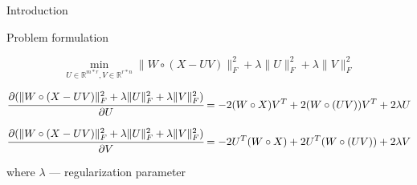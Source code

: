 \documentclass[pdf,10pt]{beamer}
\def\R{\mathbb{R}}
\begin{document}
\begin{section}{Introduction}
\begin{subsection}{Problem formulation}
\begin{frame}
     \begin{equation}
       \min_{U \in \R^{m*r}, V \in \R^{r*n}} \|W \circ (X - UV)\|^2_F + \lambda\|U\|^2_F + \lambda\|V\|^2_F
     \end{equation}

     \begin{equation}
       \cfrac{\partial (\|W \circ (X - UV)\|^2_F + \lambda\|U\|^2_F + \lambda\|V\|^2_F)}{\partial U} = -2 (W \circ X) V^T + 2 (W \circ (UV)) V^T + 2\lambda U
     \end{equation}

     \begin{equation}
       \cfrac{\partial (\|W \circ (X - UV)\|^2_F + \lambda\|U\|^2_F + \lambda\|V\|^2_F)}{\partial V} = -2 U^T (W \circ X) + 2 U^T (W \circ (UV)) + 2\lambda V
     \end{equation}

     where $\lambda$ --- regularization parameter

   \end{frame}

 \end{subsection}
\end{section}
\end{document}
